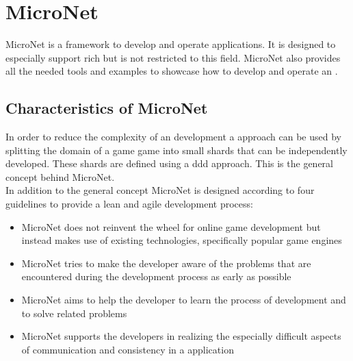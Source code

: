 \section{MicroNet}

MicroNet is a framework to develop and operate \ms{} applications. It is
designed to especially support rich \ogs{} but is not restricted to this
field. MicroNet also provides all the needed tools and examples to showcase how
to develop and operate an \og{}.

\subsection{Characteristics of MicroNet}

In order to reduce the complexity of an \og{} development a \ms{} approach can
be used by splitting the domain of a game game into small shards that can be
independently developed. These shards are defined using a 
\gls{ddd} approach. This is the general concept behind MicroNet.\\

In addition to the general concept MicroNet is designed according to four
guidelines to provide a lean and agile \og{} development process:
\begin{itemize}
  \item MicroNet does not reinvent the wheel for online game development but
  instead makes use of existing technologies, specifically popular game engines
  \item MicroNet tries to make the developer aware of the problems that are
  encountered during the development process as early as possible
  \item MicroNet aims to help the developer to learn the process of \og{}
  development and to solve related problems
  \item MicroNet supports the developers in realizing the especially
  difficult aspects of communication and consistency in a \ms{} application
\end{itemize}








 

